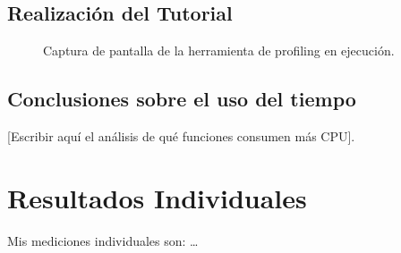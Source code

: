 \documentclass[12pt,a4paper]{article}
\begin{document}
	\subsection{Realización del Tutorial}
	\begin{figure}[H]
		\centering
		\caption{Captura de pantalla de la herramienta de profiling en ejecución.}
	\end{figure}
	
	\subsection{Conclusiones sobre el uso del tiempo}
	[Escribir aquí el análisis de qué funciones consumen más CPU].
	
	\section{Resultados Individuales}
	Mis mediciones individuales son: \dots
	
\end{document}
